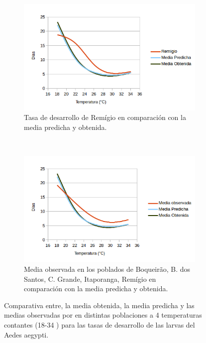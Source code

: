 \begin{figure}[!htbp]
\begin{subfigure}[b]{0.45\textwidth}
    \end{subfigure}
    \begin{subfigure}[t]{0.45\textwidth}
            \includegraphics[width=\textwidth]{capitulo-6/graphics/desarrollo-larva-5.png}
            \caption{Tasa de desarrollo de Remígio en comparación con la media predicha y obtenida.}
    \end{subfigure}
    ~~~~
    \begin{subfigure}[t]{0.45\textwidth}
            \includegraphics[width=\textwidth]{capitulo-6/graphics/desarrollo-larva-6.png}
            \caption{Media observada en los poblados de Boqueirão, B. dos Santos, C. Grande, Itaporanga, Remígio en comparación con la media predicha y obtenida.}

    \end{subfigure}

    \caption{\label{fig:desarrollo-larva-baserra2006}
    Comparativa entre, la media obtenida, la media predicha y las medias observadas por \cite{
    BESERRA2006} en distintas poblaciones a 4 temperaturas contantes (18-34 \textcelsius) para
    las tasas de desarrollo de las larvas del Aedes aegypti.}
\end{figure}

